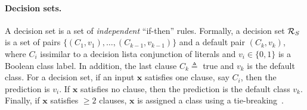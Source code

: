 \paragraph{Decision sets.} A decision set is a set of \textit{independent} ``if-then'' rules. Formally,  a decision set $ {\mathcal{R}}_S $ is a set of pairs $ \{(C_1, v_1), \dots, (C_{k-1}, v_{k-1})\}  $ and a  default pair $ (C_k, v_k) $, where $ C_i $ is\textemdash similar to a decision list\textemdash a conjunction of literals and $ v_i \in \{0,1\} $ is a Boolean class label. In addition, the last clause $ C_k \triangleq  $ true and $ v_k $ is the default class. For a  decision set, if an input $ \mathbf{x} $ satisfies one clause, say $ C_i $, then the prediction is $ v_i $. If $ \mathbf{x} $ satisfies no clause, then the prediction is the default class $ v_k $. Finally, if $ \mathbf{x} $ satisfies  $ \ge 2 $ clauses, $ \mathbf{x} $ is assigned a class using a tie-breaking~\cite{lakkaraju2016interpretable}. 











